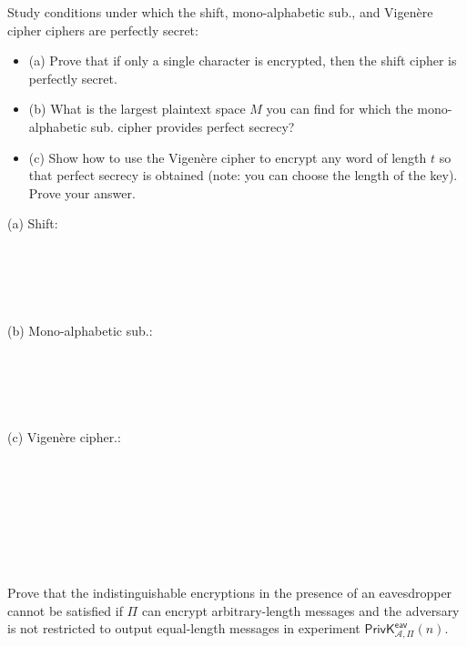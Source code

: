 \documentclass[12pt,letterpaper,boxed]{amspset}
\begin{document}
\begin{solution}
\vspace{5cm}

\end{solution}

\begin{problem}[2.2]
Study conditions under which the shift, mono-alphabetic sub., and Vigen\`{e}re cipher ciphers are perfectly secret:
\begin{itemize}
\item (a) Prove that if only a single character is encrypted, then the shift cipher is perfectly secret.
\item (b) What is the largest plaintext space $M$ you can find for which the mono-alphabetic sub. cipher provides perfect secrecy?
\item (c) Show how to use the Vigen\`{e}re cipher to encrypt any word of length $t$ so that perfect secrecy is obtained (note: you can choose the length of the key). Prove your answer.
\end{itemize}
\end{problem}

\begin{solution}
(a) Shift:\\
\\
\\
\\
\\
\\
(b) Mono-alphabetic sub.:\\
\\
\\
\\
\\
\\
(c) Vigen\`{e}re cipher.:\\
\\
\\
\\
\\
\\
\\
\\
\end{solution}

\begin{problem}[3.1]
Prove that the indistinguishable encryptions in the presence of an eavesdropper cannot be satisfied if $\Pi$ can encrypt arbitrary-length messages and the adversary is not restricted to output equal-length messages in experiment $\mathsf{PrivK}^{\mathsf{eav}}_{\mathcal{A},\Pi}(n)$.
\end{problem}
\end{document}
